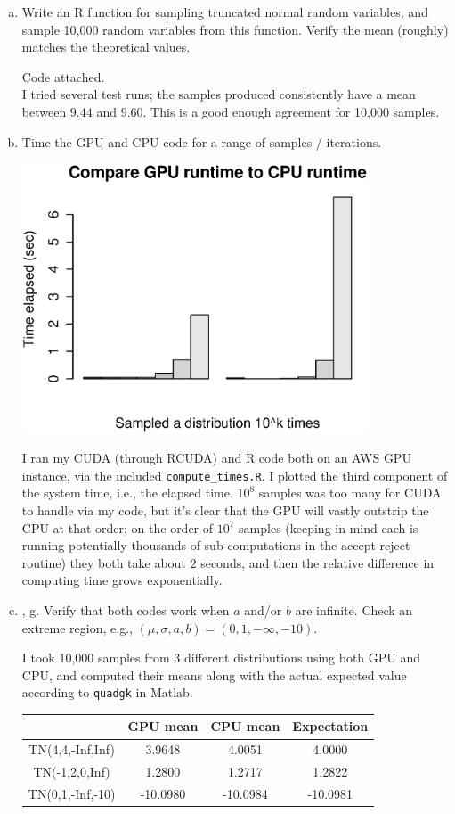 \documentclass[12pt,letterpaper]{article}
\begin{document}
\begin{enumerate}[a.]
\item Write an R function for sampling truncated normal random variables, and sample 10,000 random variables from this function. Verify the mean (roughly) matches the theoretical values.

\textsf{Code attached.} \\ I tried several test runs; the samples produced consistently have a mean between $9.44$ and $9.60$. This is a good enough agreement for 10,000 samples.

\item Time the GPU and CPU code for a range of samples / iterations.

\begin{center}
\includegraphics[height=8cm]{compare_GPU_CPU_time.eps}
\end{center}
I ran my CUDA (through RCUDA) and R code both on an AWS GPU instance, via the included \texttt{compute\_times.R}. I plotted the third component of the system time, i.e., the elapsed time. $10^8$ samples was too many for CUDA to handle via my code, but it's clear that the GPU will vastly outstrip the CPU at that order; on the order of $10^7$ samples (keeping in mind each is running potentially thousands of sub-computations in the accept-reject routine) they both take about $2$ seconds, and then the relative difference in computing time grows exponentially. 

\item , g. Verify that both codes work when $a$ and/or $b$ are infinite. Check an extreme region, e.g., $(\mu,\sigma,a,b) = (0,1,-\infty,-10)$. 

I took 10,000 samples from 3 different distributions using both GPU and CPU, and computed their means along with the actual expected value according to \texttt{quadgk} in Matlab. 

\begin{center}
\begin{tabular}{|c|c|c|c|}
\hline 
 & GPU mean & CPU mean & Expectation \\ 
\hline 
TN(4,4,-Inf,Inf) & 3.9648 & 4.0051 & 4.0000 \\ 
\hline 
TN(-1,2,0,Inf) & 1.2800 & 1.2717 & 1.2822 \\ 
\hline 
TN(0,1,-Inf,-10) & -10.0980 & -10.0984 & -10.0981 \\ 
\hline 
\end{tabular} 
\end{center}

\end{enumerate}
\end{document}
